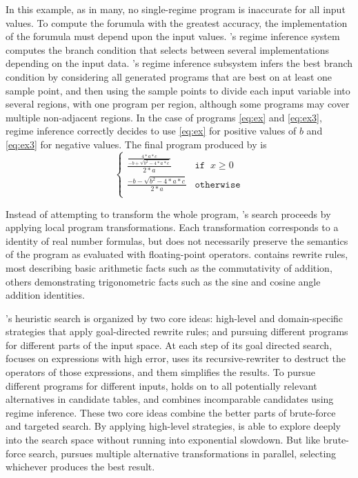\documentclass[paper.tex]{subfiles}
\begin{document}
In this example, as in many, no single-regime program is inaccurate
for all input values.  To compute the forumula with the greatest
accuracy, the implementation of the forumula must depend upon the
input values.  \casio's regime inference system computes the branch
condition that selects between several implementations depending on
the input data.  \casio's regime inference subsystem infers the best
branch condition by considering all generated programs that are best
on at least one sample point, and then using the sample points to
divide each input variable into several regions, with one program per
region, although some programs may cover multiple non-adjacent
regions.  In the case of programs \eqref{eq:ex} and \eqref{eq:ex3},
regime inference correctly decides to use \eqref{eq:ex} for positive
values of $b$ and \eqref{eq:ex3} for negative values.  The final
program produced by \casio is
\[
\begin{cases}
  \frac{\frac{4*a*c}
             {-b + \sqrt{b^2 - 4*a*c}}}
       {2*a} & \mathtt{if} \;\; x \ge 0 \\[8pt]
  \frac{-b - \sqrt{b^2 - 4*a*c}}
       {2*a} & \mathtt{otherwise} \\
\end{cases}
\]

Instead of attempting to transform the whole program, \casio's search
proceeds by applying local program transformations.  
Each transformation corresponds to a identity of real number formulas,
but does not necessarily preserve the semantics of the program as
evaluated with floating-point operators.  \casio contains \nRewrites
rewrite rules, most describing basic arithmetic facts such as the
commutativity of addition, others demonstrating trigonometric facts
such as the sine and cosine angle addition identities.

\casio's heuristic search is organized by two core ideas: high-level
and domain-specific strategies that apply goal-directed rewrite rules;
and pursuing different programs for different parts of the input
space.  At each step of its goal directed search, \casio focuses on
expressions with high error, uses its recursive-rewriter to destruct
the operators of those expressions, and them simplifies the results.
To pursue different programs for different inputs, \casio holds on to
all potentially relevant alternatives in candidate tables, and combines
incomparable candidates using regime inference.  These two core ideas
combine the better parts of brute-force and targeted search.  By
applying high-level strategies, \casio is able to explore deeply into
the search space without running into exponential slowdown.  But like
brute-force search, \casio pursues multiple alternative
transformations in parallel, selecting whichever produces the best
result.
\end{document}
